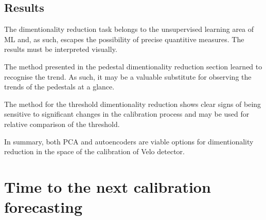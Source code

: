 \subsection{Results}

The dimentionality reduction task belongs to the unsupervised learning area of ML and, as such, escapes the possibility of precise quantitive measures. The results must be interpreted visually.

The method presented in the pedestal dimentionality reduction section learned to recognise the trend. As such, it may be a valuable substitute for observing the trends of the pedestals at a glance.

The method for the threshold dimentionality reduction shows clear signs of being sensitive to significant changes in the calibration process and may be used for relative comparison of the threshold.

In summary, both PCA and autoencoders are viable options for dimentionality reduction in the space of the calibration of Velo detector.


\section{Time to the next calibration forecasting}
\label{chap4:wtte}

